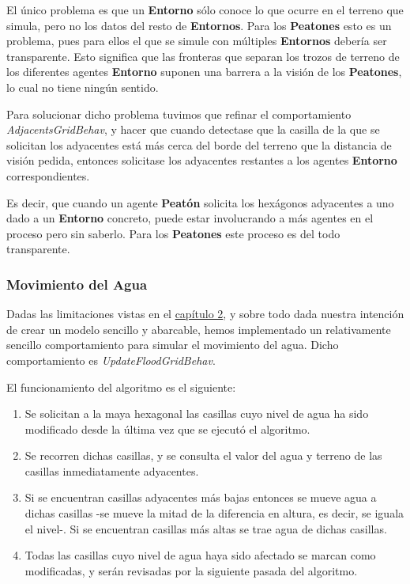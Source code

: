 El único problema es que un {\bf Entorno} sólo conoce lo que ocurre en el
terreno que simula, pero no los datos del resto de {\bf Entornos}. Para los
{\bf Peatones} esto es un problema, pues para ellos el que se simule con
múltiples {\bf Entornos} debería ser transparente. Esto significa que las
fronteras que separan los trozos de terreno de los diferentes agentes {\bf
Entorno} suponen una barrera a la visión de los {\bf Peatones}, lo cual no
tiene ningún sentido.

Para solucionar dicho problema tuvimos que refinar el comportamiento {\em
AdjacentsGridBehav}, y hacer que cuando detectase que la casilla de la que se
solicitan los adyacentes está más cerca del borde del terreno que la distancia
de visión pedida, entonces solicitase los adyacentes restantes a los agentes
{\bf Entorno} correspondientes.

Es decir, que cuando un agente {\bf Peatón} solicita los hexágonos adyacentes a
uno dado a un {\bf Entorno} concreto, puede estar involucrando a más agentes en
el proceso pero sin saberlo. Para los {\bf Peatones} este proceso es del todo
transparente.

\subsubsection{Movimiento del Agua}

Dadas las limitaciones vistas en el \hyperref[cap2]{capítulo 2}, y sobre todo
dada nuestra intención de crear un modelo sencillo y abarcable, hemos
implementado un relativamente sencillo comportamiento para simular el
movimiento del agua. Dicho comportamiento es {\em UpdateFloodGridBehav}.

El funcionamiento del algoritmo es el siguiente:

\begin{enumerate}
 \item Se solicitan a la maya hexagonal las casillas cuyo nivel de agua ha sido
 modificado desde la última vez que se ejecutó el algoritmo.
 \item Se recorren dichas casillas, y se consulta el valor del agua y terreno
 de las casillas inmediatamente adyacentes.
 \item Si se encuentran casillas adyacentes más bajas entonces se mueve agua a
 dichas casillas -se mueve la mitad de la diferencia en altura, es decir, se
 iguala el nivel-. Si se encuentran casillas más altas se trae agua de dichas
 casillas.
 \item Todas las casillas cuyo nivel de agua haya sido afectado se marcan como
 modificadas, y serán revisadas por la siguiente pasada del algoritmo.
\end{enumerate}

